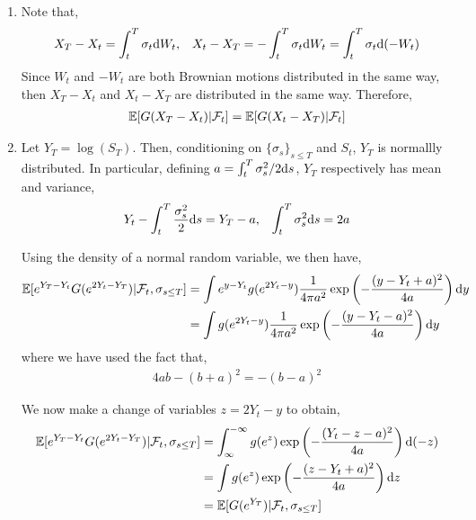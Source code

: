 \begin{solution}[Solution]
\begin{enumerate}[label=(\alph*)]
    \item Note that,
        \begin{align*}
            X_T - X_t = \int_t^T \sigma_t \mathrm{d} W_t
            , && 
            X_t - X_T = -\int_t^T \sigma_t \mathrm{d} W_t = \int_t^T \sigma_t \mathrm{d} (-W_t)
        \end{align*}
        Since \( W_t \) and \( -W_t \) are both Brownian motions distributed in the same way, then \( X_T-X_t \) and \( X_t - X_T \) are distributed in the same way. Therefore,
        \begin{align*}
            \mathbb{E}[G(X_T-X_t) | \mathcal{F}_t ] = \mathbb{E}[G(X_t-X_T) | \mathcal{F}_t]
        \end{align*}
        
    \item
        Let \( Y_T = \log(S_T) \). Then, conditioning on \( \{ \sigma_s\}_{s\leq T} \) and \( S_t \), \( Y_T \) is normallly distributed. In particular, defining \( a = \int_t^T \sigma_s^2/2\mathrm{d} s\), \( Y_T \) respectively has mean and variance,
        \begin{align*}
            Y_t - \int_t^T \frac{\sigma_s^2}{2}\mathrm{d} s = Y_T-a
            , &&
            \int_t^T\sigma_s^2\mathrm{d} s = 2 a
        \end{align*}
        
        Using the density of a normal random variable, we then have,
        \begin{align*}
            \mathbb{E}[e^{Y_T-Y_t} G(e^{2Y_t-Y_T}) | \mathcal{F}_t, \sigma_{s\leq T}]
            &=\int e^{y-Y_t} g(e^{2Y_t-y}) \frac{1}{4\pi a^2} \exp\left( - \frac{(y-Y_t+a)^2}{4a}\right)\mathrm{d} y
            \\&=\int g(e^{2Y_t-y}) \frac{1}{4\pi a^2} \exp\left( - \frac{(y-Y_t-a)^2}{4a}\right)\mathrm{d} y
        \end{align*}
        where we have used the fact that,
        \begin{align*}
            4a b - (b+a)^2 = -(b-a)^2
        \end{align*}
       
        We now make a change of variables \( z = 2Y_t-y \) to obtain,
        \begin{align*}
            \mathbb{E}[e^{Y_T-Y_t} G(e^{2Y_t-Y_T}) | \mathcal{F}_t,\sigma_{s\leq T}]
            &=\int_\infty^{-\infty} g(e^z) \exp \left( -\frac{(Y_t-z-a)^2}{4a} \right) \mathrm{d}(-z)
            \\&= \int g(e^z) \exp \left( -\frac{(z-Y_t+a)^2}{4a} \right) \mathrm{d} z
            \\&=\mathbb{E}[ G(e^{Y_T}) | \mathcal{F}_t, \sigma_{s\leq T}]
        \end{align*}
        

\end{enumerate}
\end{solution}
